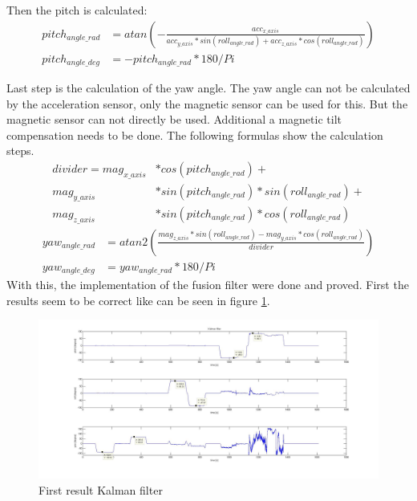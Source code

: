 Then the pitch is calculated:
\begin{align}
pitch_{angle\_rad}&=atan\left(-\frac{acc_{x\_axis}}{acc_{y\_axis}*sin(roll_{angle\_rad})+acc_{z\_axis}*cos(roll_{angle\_rad})}\right)\\
pitch_{angle\_deg}&=-pitch_{angle\_rad}*180/Pi
\end{align}

Last step is the calculation of the yaw angle. The yaw angle can not be calculated by the acceleration sensor, only the magnetic sensor can be used for this. But the magnetic sensor can not directly be used. Additional a magnetic tilt compensation needs to be done. The following formulas show the calculation steps.\\
\begin{align}
divider=mag_{x\_axis}&*cos(pitch_{angle\_rad})+\\
mag_{y\_axis}&*sin(pitch_{angle\_rad})*sin(roll_{angle\_rad})+\\
mag_{z\_axis}&*sin(pitch_{angle\_rad})*cos(roll_{angle\_rad})
\end{align}
\begin{align}		
yaw_{angle\_rad}&=atan2\left(\frac{mag_{z\_axis}*sin(roll_{angle\_rad})-mag_{y\_axis}*cos(roll_{angle\_rad})}{divider}\right)\\
yaw_{angle\_deg}&=yaw_{angle\_rad}*180/Pi
\end{align}
With this, the implementation of the fusion filter were done and proved. First the results seem to be correct like can be seen in figure \ref{fig:initial_angle}.

\begin{figure}[H]
	\centering\includegraphics[width=1.0\textwidth]{fig/Res_Kal_Comp/initial_Kalman}
	\caption{First result Kalman filter}
	\label{fig:initial_angle}
\end{figure}

